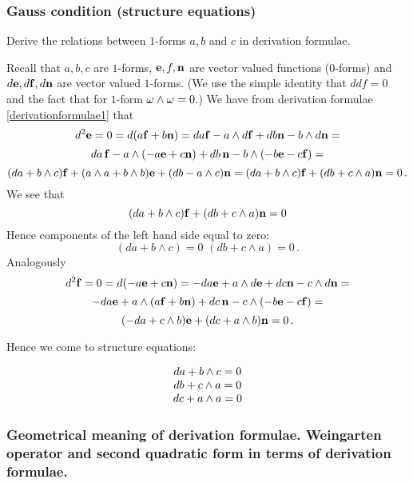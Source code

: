 \documentclass[12pt]{article}
\theoremstyle{theorem}
\numberwithin{equation}{section}
\begin{document}
 \subsubsection  {Gauss condition (structure equations)}
    Derive the relations between $1$-forms $a,b$ and $c$ in derivation formulae.

    Recall that $a,b,c$ are $1$-forms, ${\bf e},f,{\bf n}$ are vector valued functions ($0$-forms)
    and  $d{\bf e},d{\bf f},d{\bf n}$ are vector valued $1$-forms.
    (We use the simple identity that $ddf=0$ and the fact that for $1$-form $\omega\wedge \omega=0$.)
     We have from derivation formulae \eqref{derivationformulae1} that
         $$
     d^2{\bf e}=0= d(a{\bf f}+b{\bf n})=da{\bf f}-a\wedge d{\bf f}+db{\bf n}-b\wedge d{\bf n}=
        $$
        $$
        da\, {\bf f}-a\wedge (-a {\bf e}+c{\bf n})+db\,{\bf n}-b\wedge(-b{\bf e}-c{\bf f})=
                       $$
                       $$
          (da+b\wedge c){\bf f}+(a\wedge a+b\wedge b){\bf e}+(db-a\wedge c){\bf n}=
          (da+b\wedge c){\bf f}+(db+c\wedge a){\bf n}=0\,.
                      $$
We see that
                \begin{equation}\label{gausscondition1}
                    (da+b\wedge c){\bf f}+(db+c\wedge a){\bf n}=0
                \end{equation}
                Hence components of the left hand side equal to zero:
\begin{equation}\label{gausscondition2}
                    (da+b\wedge c)=0\,\,(db+c\wedge a)=0\,.
                \end{equation}
Analogously
              $$
                       d^2{\bf f}=0= d(-a{\bf e}+c{\bf n})=-da{\bf e}+a\wedge d{\bf e}+dc{\bf n}-c\wedge d{\bf n}=
        $$
        $$
        -da{\bf e}+a\wedge (a {\bf f}+b{\bf n})+dc\,{\bf n}-c\wedge(-b{\bf e}-c{\bf f})=
                       $$
                       $$
          (-da+c\wedge b){\bf e}+(dc+a\wedge b){\bf n}=0\,.
              $$


 Hence we come to structure equations:

               \begin{equation}\label{firststructureformula}
               \begin{matrix}
                da+b\wedge c=0\cr
                 db+c\wedge a=0\cr
                 dc+a\wedge a=0\cr
                 \end{matrix}
               \end{equation}


          \subsubsection {Geometrical meaning of derivation formulae.
         Weingarten operator and second quadratic form in terms of derivation formulae. }
\end{document}
